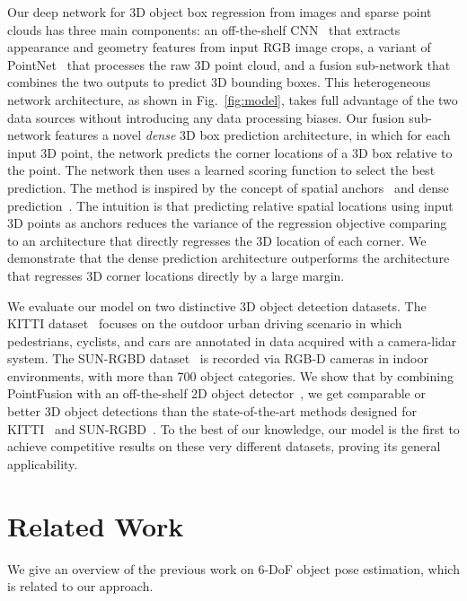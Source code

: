 \documentclass[10pt,twocolumn,letterpaper]{article}
\begin{document}
Our deep network for 3D object box regression from images and sparse point clouds has three main components: an off-the-shelf CNN~\cite{resnet} that extracts appearance and geometry features from input RGB image crops, a variant of PointNet~\cite{qi2016pointnet} that processes the raw 3D point cloud, and a fusion sub-network that combines the two outputs to predict 3D bounding boxes. This heterogeneous network architecture, as shown in Fig.~\ref{fig:model}, takes full advantage of the two data sources without introducing any data processing biases. Our fusion sub-network features a novel \textit{dense} 3D box prediction architecture, in which for each input 3D point, the network predicts the corner locations of a 3D box relative to the point. The network then uses a learned scoring function to select the best prediction. The method is inspired by the concept of spatial anchors~\cite{ren2015faster} and dense prediction~\cite{huang2015densebox}. The intuition is that predicting relative spatial locations using input 3D points as anchors reduces the variance of the regression objective comparing to an architecture that directly regresses the 3D location of each corner. We demonstrate that the dense prediction architecture outperforms the architecture that regresses 3D corner locations directly by a large margin.

We evaluate our model on two distinctive 3D object detection datasets. The KITTI dataset~\cite{kitti} focuses on the outdoor urban driving scenario in which pedestrians, cyclists, and cars are annotated in data acquired with a camera-lidar system. The SUN-RGBD dataset~\cite{song2015sun} is recorded via RGB-D cameras in indoor environments, with more than 700 object categories. We show that by combining PointFusion with an off-the-shelf 2D object detector~\cite{ren2015faster}, we get comparable or better 3D object detections than the state-of-the-art methods designed for KITTI~\cite{mv3d} and SUN-RGBD~\cite{lahoud20172d,song2016deep,ren2016three}. To the best of our knowledge, our model is the first to achieve competitive results on these very different datasets, proving its general applicability.


\section{Related Work}
We give an overview of the previous work on 6-DoF object pose estimation, which is related to our approach. 
\end{document}
